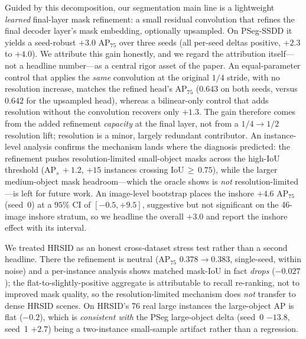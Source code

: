\documentclass[journal]{IEEEtran}
\begin{document}
Guided by this decomposition, our segmentation main line is a lightweight \emph{learned} final-layer mask refinement: a small residual convolution that refines the final decoder layer's mask embedding, optionally upsampled. On PSeg-SSDD it yields a seed-robust $+3.0$ AP$_{75}$ over three seeds (all per-seed deltas positive, $+2.3$ to $+4.0$). We attribute this gain honestly, and we regard the attribution itself---not a headline number---as a central rigor asset of the paper. An equal-parameter control that applies the \emph{same} convolution at the original $1/4$ stride, with no resolution increase, matches the refined head's AP$_{75}$ ($0.643$ on both seeds, versus $0.642$ for the upsampled head), whereas a bilinear-only control that adds resolution without the convolution recovers only $+1.3$. The gain therefore comes from the added refinement \emph{capacity} at the final layer, not from a $1/4\!\rightarrow\!1/2$ resolution lift; resolution is a minor, largely redundant contributor. An instance-level analysis confirms the mechanism lands where the diagnosis predicted: the refinement pushes resolution-limited small-object masks across the high-IoU threshold (AP$_{s}\,{+}1.2$, $+15$ instances crossing IoU$\,{\ge}\,0.75$), while the larger medium-object mask headroom---which the oracle shows is \emph{not} resolution-limited---is left for future work. An image-level bootstrap places the inshore $+4.6$ AP$_{75}$ (seed~0) at a $95\%$ CI of $[-0.5,+9.5]$, suggestive but not significant on the 46-image inshore stratum, so we headline the overall $+3.0$ and report the inshore effect with its interval.

We treated HRSID as an honest cross-dataset stress test rather than a second headline. There the refinement is neutral (AP$_{75}$ $0.378\!\rightarrow\!0.383$, single-seed, within noise) and a per-instance analysis shows matched mask-IoU in fact \emph{drops} ($-0.027$); the flat-to-slightly-positive aggregate is attributable to recall re-ranking, not to improved mask quality, so the resolution-limited mechanism does \emph{not} transfer to dense HRSID scenes. On HRSID's 76 real large instances the large-object AP is flat ($-0.2$), which is \emph{consistent with} the PSeg large-object delta (seed~0 $-13.8$, seed~1 $+2.7$) being a two-instance small-sample artifact rather than a regression.
\end{document}
